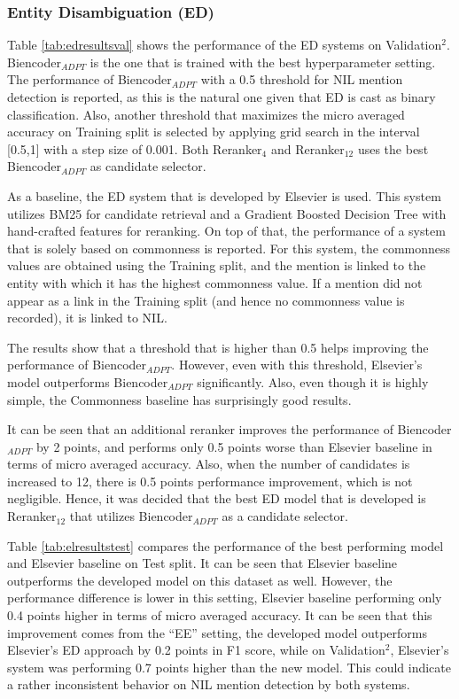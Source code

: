 \documentclass{report}
\theoremstyle{definition}
\theoremstyle{remark}
\begin{document}
\subsubsection{Entity Disambiguation (ED)}
Table \ref{tab:edresultsval} shows the performance of the ED systems on Validation$^2$. Biencoder$_{ADPT}$ is the one that is trained with the best hyperparameter setting. The performance of Biencoder$_{ADPT}$ with a 0.5 threshold for NIL mention detection is reported, as this is the natural one given that ED is cast as binary classification. Also, another threshold that maximizes the micro averaged accuracy on Training split is selected by applying grid search in the interval [0.5,1] with a step size of 0.001. Both Reranker$_{4}$ and Reranker$_{12}$ uses the best Biencoder$_{ADPT}$ as candidate selector. 

As a baseline, the ED system that is developed by Elsevier is used. This system utilizes BM25 for candidate retrieval and a Gradient Boosted Decision Tree with hand-crafted features for reranking. On top of that, the performance of a system that is solely based on commonness is reported. For this system, the commonness values are obtained using the Training split, and the mention is linked to the entity with which it has the highest commonness value. If a mention did not appear as a link in the Training split (and hence no commonness value is recorded), it is linked to NIL.

The results show that a threshold that is higher than 0.5 helps improving the performance of Biencoder$_{ADPT}$. However, even with this threshold, Elsevier's model outperforms Biencoder$_{ADPT}$ significantly. Also, even though it is highly simple, the Commonness baseline has surprisingly good results.

It can be seen that an additional reranker improves the performance of Biencoder$_{ADPT}$ by 2 points, and performs only 0.5 points worse than Elsevier baseline in terms of micro averaged accuracy. Also, when the number of candidates is increased to 12, there is 0.5 points performance improvement, which is not negligible. Hence, it was decided that the best ED model that is developed is Reranker$_{12}$ that utilizes Biencoder$_{ADPT}$ as a candidate selector.

Table \ref{tab:elresultstest} compares the performance of the best performing model and Elsevier baseline on Test split. It can be seen that Elsevier baseline outperforms the developed model on this dataset as well. However, the performance difference is lower in this setting, Elsevier baseline performing only 0.4 points higher in terms of micro averaged accuracy. It can be seen that this improvement comes from the ``EE'' setting, the developed model outperforms Elsevier's ED approach by 0.2 points in F1 score, while on Validation$^2$, Elsevier's system was performing 0.7 points higher than the new model. This could indicate a rather inconsistent behavior on NIL mention detection by both systems.
\end{document}
